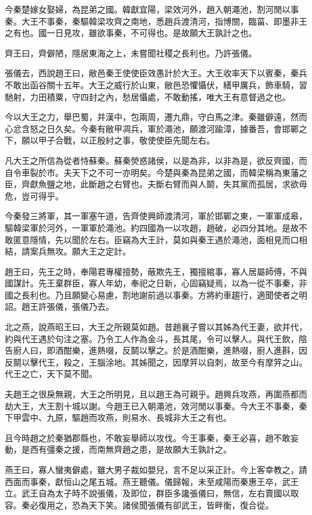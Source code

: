 今秦楚嫁女娶婦，為昆弟之國。韓獻宜陽，梁效河外，趙入朝澠池，割河閒以事秦。大王不事秦，秦驅韓梁攻齊之南地，悉趙兵渡清河，指博關，臨菑、即墨非王之有也。國一日見攻，雖欲事秦，不可得也。是故願大王孰計之也。

齊王曰，齊僻陋，隱居東海之上，未嘗聞社稷之長利也。乃許張儀。

張儀去，西說趙王曰，敝邑秦王使使臣效愚計於大王。大王收率天下以賓秦，秦兵不敢出函谷關十五年。大王之威行於山東，敝邑恐懼懾伏，繕甲厲兵，飾車騎，習馳射，力田積粟，守四封之內，愁居懾處，不敢動搖，唯大王有意督過之也。

今以大王之力，舉巴蜀，并漢中，包兩周，遷九鼎，守白馬之津。秦雖僻遠，然而心忿含怒之日久矣。今秦有敝甲凋兵，軍於澠池，願渡河踰漳，據番吾，會邯鄲之下，願以甲子合戰，以正殷紂之事，敬使使臣先聞左右。

凡大王之所信為從者恃蘇秦。蘇秦熒惑諸侯，以是為非，以非為是，欲反齊國，而自令車裂於市。夫天下之不可一亦明矣。今楚與秦為昆弟之國，而韓梁稱為東藩之臣，齊獻魚鹽之地，此斷趙之右臂也。夫斷右臂而與人鬬，失其黨而孤居，求欲毋危，豈可得乎。

今秦發三將軍，其一軍塞午道，告齊使興師渡清河，軍於邯鄲之東，一軍軍成皋，驅韓梁軍於河外，一軍軍於澠池。約四國為一以攻趙，趙破，必四分其地。是故不敢匿意隱情，先以聞於左右。臣竊為大王計，莫如與秦王遇於澠池，面相見而口相結，請案兵無攻。願大王之定計。

趙王曰，先王之時，奉陽君專權擅勢，蔽欺先王，獨擅綰事，寡人居屬師傅，不與國謀計。先王棄群臣，寡人年幼，奉祀之日新，心固竊疑焉，以為一從不事秦，非國之長利也。乃且願變心易慮，割地謝前過以事秦。方將約車趨行，適聞使者之明詔。趙王許張儀，張儀乃去。

北之燕，說燕昭王曰，大王之所親莫如趙。昔趙襄子嘗以其姊為代王妻，欲并代，約與代王遇於句注之塞。乃令工人作為金斗，長其尾，令可以擊人。與代王飲，陰告廚人曰，即酒酣樂，進熱啜，反鬬以擊之。於是酒酣樂，進熱啜，廚人進斟，因反鬬以擊代王，殺之，王腦涂地。其姊聞之，因摩笄以自刺，故至今有摩笄之山。代王之亡，天下莫不聞。

夫趙王之很戾無親，大王之所明見，且以趙王為可親乎。趙興兵攻燕，再圍燕都而劫大王，大王割十城以謝。今趙王已入朝澠池，效河閒以事秦。今大王不事秦，秦下甲雲中、九原，驅趙而攻燕，則易水、長城非大王之有也。

且今時趙之於秦猶郡縣也，不敢妄舉師以攻伐。今王事秦，秦王必喜，趙不敢妄動，是西有彊秦之援，而南無齊趙之患，是故願大王孰計之。

燕王曰，寡人蠻夷僻處，雖大男子裁如嬰兒，言不足以采正計。今上客幸教之，請西面而事秦，獻恒山之尾五城。燕王聽儀。儀歸報，未至咸陽而秦惠王卒，武王立。武王自為太子時不說張儀，及即位，群臣多讒張儀曰，無信，左右賣國以取容。秦必復用之，恐為天下笑。諸侯聞張儀有卻武王，皆畔衡，復合從。

